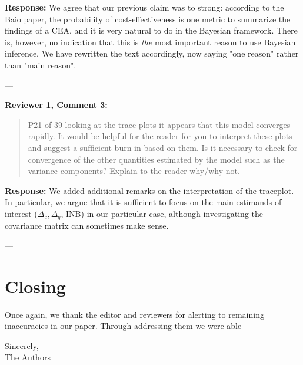 \documentclass[11pt]{article}
\begin{document}
\textbf{Response:}  
We agree that our previous claim was to strong: according to the Baio paper, the probability of cost-effectiveness is one metric to summarize the findings of a CEA, and it is very natural to do in the Bayesian framework. There is, however, no indication that this is \emph{the} most important reason to use Bayesian inference. We have rewritten the text accordingly, now saying "one reason" rather than "main reason".

---

\textbf{Reviewer 1, Comment 3:}
\begin{quote}
P21 of 39 looking at the trace plots it appears that this model converges rapidly. It would be helpful for the reader for you to interpret these plots and suggest a sufficient burn in based on them. Is it necessary to check for convergence of the other quantities estimated by the model such as the variance components? Explain to the reader why/why not.
\end{quote}

\textbf{Response:}  
We added additional remarks on the interpretation of the traceplot. In particular, we argue that it is sufficient to focus on the main estimands of interest ($\Delta_c, \Delta_q$, INB) in our particular case, although investigating the covariance matrix can sometimes make sense. 

---

\section*{Closing}

Once again, we thank the editor and reviewers for alerting to remaining inaccuracies in our paper. Through addressing them we were able 

\vspace{1em}

Sincerely,\\
The Authors
\end{document}
